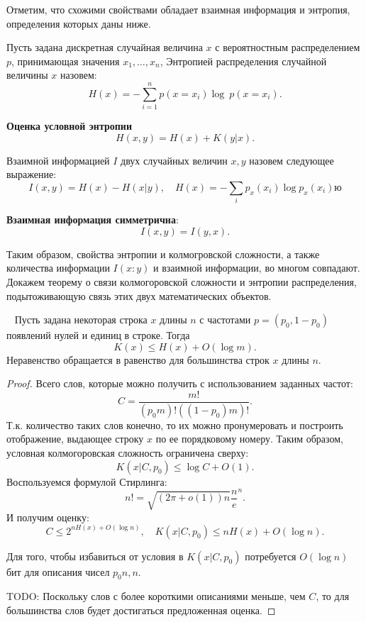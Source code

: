 \documentclass[../main.tex]{subfiles}
\begin{document}
Отметим, что схожими свойствами обладает взаимная информация и энтропия, определения которых даны ниже.

\begin{definition}
Пусть задана дискретная случайная величина $x$ с вероятностным распределением $p$, принимающая значения $x_1, \dots, x_n$,
Энтропией распределения случайной величины $x$ назовем:
\[
	H(x) = -\sum_{i=1}^n p(x = x_i) \log~p(x = x_i).
\]
\end{definition}
\textbf{Оценка условной энтропии}
\[
	H(x,y) = H(x) + K(y|x).
\]
\begin{definition}
Взаимной информацией $I$ двух случайных величин $x,y$ назовем следующее выражение:
\[
	I(x,y) = H(x) - H(x|y), \quad H(x) = - \sum_{i} p_x(x_i) \log p_x(x_i)ю
\]
\end{definition}
\textbf{Взаимная информация симметрична}:
\[
I(x,y) = I(y,x).
\]

Таким образом, свойства энтропии и колмогровской сложности, а также количества информации $I(x:y)$ и взаимной информации, во многом совпадают. Докажем теорему о связи колмогоровской сложности и энтропии распределения, подытоживающую связь этих двух математических объектов.

\begin{theorem}~\cite{kolmogorov}
Пусть задана некоторая строка $x$ длины $n$ с частотами  $p = (p_0, 1 - p_0)$ появлений нулей и единиц в строке.
Тогда
\[
K(x) \leq H(x) + O(\log m).
\]
Неравенство обращается в равенство для большинства строк $x$ длины $n$.
\end{theorem}
\begin{proof}
Всего слов, которые можно получить с использованием заданных частот:
\[
    C = \frac{m!}{(p_0 m)! ((1-p_0)m)! }.
\]
Т.к. количество таких слов конечно, то их можно пронумеровать и построить отображение, выдающее строку $x$ по ее порядковому номеру.
Таким образом, условная колмогоровская сложность ограничена сверху:
\[
K(x|C, p_0) \leq \log C + O(1).
\]
Воспользуемся формулой Стирлинга:
\[
    n! = \sqrt{(2\pi + o(1))n}\frac{n}{e}^n.
\]
И получим оценку:
\[
    C \leq 2^{nH(x) + O(\log n)}, \quad K(x|C, p_0) \leq  nH(x) + O(\log n).
\]

Для того, чтобы избавиться от условия в $K(x|C, p_0)$  потребуется $O(\log n)$ бит для описания чисел $p_0n, n$.

TODO: Поскольку слов с более короткими описаниями меньше, чем $C$, то для большинства слов будет достигаться предложенная оценка.
\end{proof}
\end{document}
